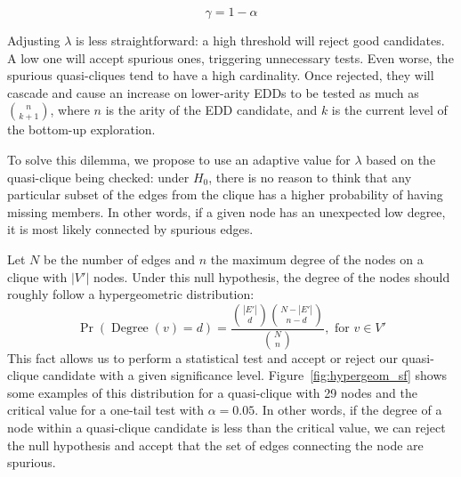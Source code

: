 \begin{equation*}
    \gamma = 1 - \alpha   
\end{equation*}

Adjusting $\lambda$ is less straightforward: a high threshold
will reject good candidates. A low one will accept spurious ones, triggering
unnecessary tests. Even worse, the spurious quasi-cliques tend to have a high cardinality.
Once rejected, they will cascade and cause an increase on lower-arity \glspl{EDD}
to be tested as much as $\binom{n}{k+1}$, where $n$ is the arity of the \gls{EDD} candidate,
and $k$ is the current level of the bottom-up exploration.

To solve this dilemma, we propose to use an adaptive value for $\lambda$ based on the
quasi-clique being checked: under $H_0$, there is no reason to think that any
particular subset of the edges from the clique has a higher probability of
having missing members. In other words, if a given node has an
unexpected low degree, it is most likely connected by spurious edges.

Let $N$ be the number of edges and $n$ the
maximum degree of the nodes on a clique with $|V'|$ nodes. Under this null hypothesis,
the degree of the nodes should roughly follow a hypergeometric distribution:
\begin{equation}
    \Pr(\operatorname{Degree}(v) = d)  = \frac{\binom{|E'|}{d} \binom{N - |E'|}{n - d}}{\binom{N}{n}}, \textrm{ for } v \in V'
    \label{eq:hypergeometric}
\end{equation}
This fact allows us to perform a statistical test and accept or reject our
quasi-clique candidate with a given significance level.
Figure~\ref{fig:hypergeom_sf} shows some examples of this distribution for a
quasi-clique with 29 nodes and the critical value for
a one-tail test with $\alpha = 0.05$. In other words, if the degree of a
node within a quasi-clique candidate is less than the critical value, we can reject the
null hypothesis and accept that the set of edges connecting the node are spurious.

